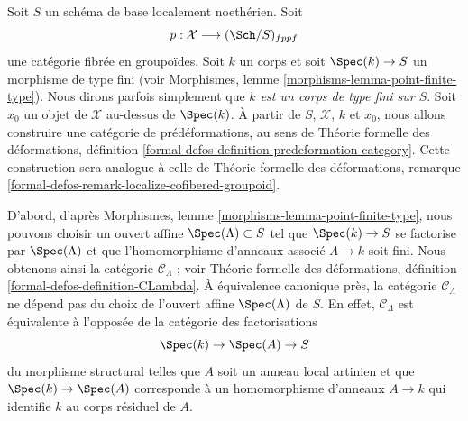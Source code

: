 \noindent
Soit $S$ un schéma de base localement noethérien. Soit
$$
p : \mathcal{X} \longrightarrow (\Sch/S)_{fppf}
$$
une catégorie fibrée en groupoïdes. Soit $k$ un corps
et soit $\Spec(k) \to S$ un morphisme de type fini (voir
Morphismes, lemme \ref{morphisms-lemma-point-finite-type}). Nous dirons parfois
simplement que {\it $k$ est un corps de type fini sur $S$}. Soit
$x_0$ un objet de $\mathcal{X}$ au-dessus de $\Spec(k)$.
À partir de $S$, $\mathcal{X}$, $k$ et $x_0$, nous allons construire une
catégorie de prédéformations, au sens de
Théorie formelle des déformations,
définition \ref{formal-defos-definition-predeformation-category}.
Cette construction sera analogue à celle de
Théorie formelle des déformations,
remarque \ref{formal-defos-remark-localize-cofibered-groupoid}.

\medskip\noindent
D'abord, d'après Morphismes, lemme \ref{morphisms-lemma-point-finite-type},
nous pouvons choisir un ouvert affine $\Spec(\Lambda) \subset S$ tel que
$\Spec(k) \to S$ se factorise par $\Spec(\Lambda)$ et que l'homomorphisme
d'anneaux associé $\Lambda \to k$ soit fini. Nous obtenons ainsi la catégorie
$\mathcal{C}_\Lambda$ ; voir
Théorie formelle des déformations, définition \ref{formal-defos-definition-CLambda}.
À équivalence canonique près, la catégorie $\mathcal{C}_\Lambda$
ne dépend pas du choix de l'ouvert affine $\Spec(\Lambda)$ de $S$.
En effet, $\mathcal{C}_\Lambda$ est équivalente à l'opposée
de la catégorie des factorisations
\begin{equation}
\label{equation-factor}
\Spec(k) \to \Spec(A) \to S
\end{equation}
du morphisme structural telles que $A$ soit un anneau local artinien et
que $\Spec(k) \to \Spec(A)$ corresponde à un homomorphisme d'anneaux $A \to k$
qui identifie $k$ au corps résiduel de $A$.

